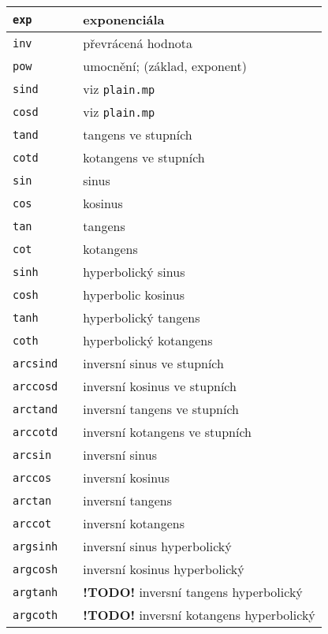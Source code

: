 \documentclass[a4paper,10pt]{article}
\begin{document}
\begin{tabularx}{\textwidth}{|l|l|X|}
    \verb+exp+  && exponenciála\\\hline
    \verb+inv+  && převrácená hodnota\\\hline
    \verb+pow+  && umocnění; (základ, exponent)\\\hline
    \hline
    \verb+sind+ && viz {\tt plain.mp}\\\hline
    \verb+cosd+ && viz {\tt plain.mp}\\\hline
    \verb+tand+ && tangens ve stupních\\\hline
    \verb+cotd+ && kotangens ve stupních\\\hline
    \verb+sin+  && sinus\\\hline
    \verb+cos+  && kosinus\\\hline
    \verb+tan+  && tangens\\\hline
    \verb+cot+  && kotangens\\\hline
    \hline
    \verb+sinh+ && hyperbolický sinus\\\hline
    \verb+cosh+ && hyperbolic kosinus\\\hline
    \verb+tanh+ && hyperbolický tangens\\\hline
    \verb+coth+ && hyperbolický kotangens\\\hline
    \hline
    \verb+arcsind+ && inversní sinus ve stupních\\\hline
    \verb+arccosd+ && inversní kosinus ve stupních\\\hline
    \verb+arctand+ && inversní tangens ve stupních\\\hline
    \verb+arccotd+ && inversní kotangens ve stupních\\\hline
    \verb+arcsin+  && inversní sinus\\\hline
    \verb+arccos+  && inversní kosinus\\\hline
    \verb+arctan+ && inversní tangens\\\hline
    \verb+arccot+ && inversní kotangens\\\hline 
    \verb+argsinh+  && inversní sinus hyperbolický\\\hline
    \verb+argcosh+  && inversní kosinus hyperbolický\\\hline

    \verb+argtanh+  && {\bf !TODO!} inversní tangens hyperbolický\\\hline
    \verb+argcoth+  && {\bf !TODO!} inversní kotangens hyperbolický\\\hline
\end{tabularx}\bigskip
\end{document}
